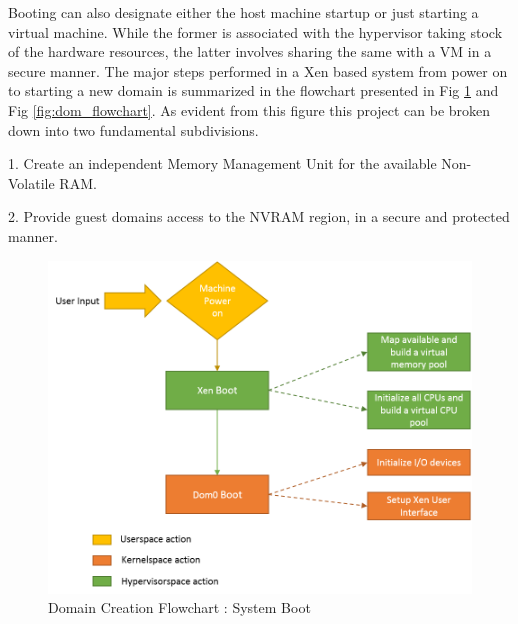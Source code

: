 Booting can also designate either the host machine startup or just starting a virtual machine. While the former is associated with the hypervisor taking stock of the hardware resources, the latter involves sharing the same with a VM in a secure manner. The major steps performed in a Xen based system from power on to starting a new domain is summarized in the flowchart presented in Fig \ref{fig:xen_flowchart} and Fig \ref{fig:dom_flowchart}. As evident from this figure this project can be broken down into two fundamental subdivisions.

1. Create an independent Memory Management Unit for the available Non-Volatile RAM.

2. Provide guest domains access to the NVRAM region, in a secure and protected manner. 


\begin{figure}[H]
\centering
\includegraphics[scale=0.9]{figures/domain_creation1.png}
\caption{Domain Creation Flowchart : System Boot}
\label{fig:xen_flowchart}
\end{figure}

